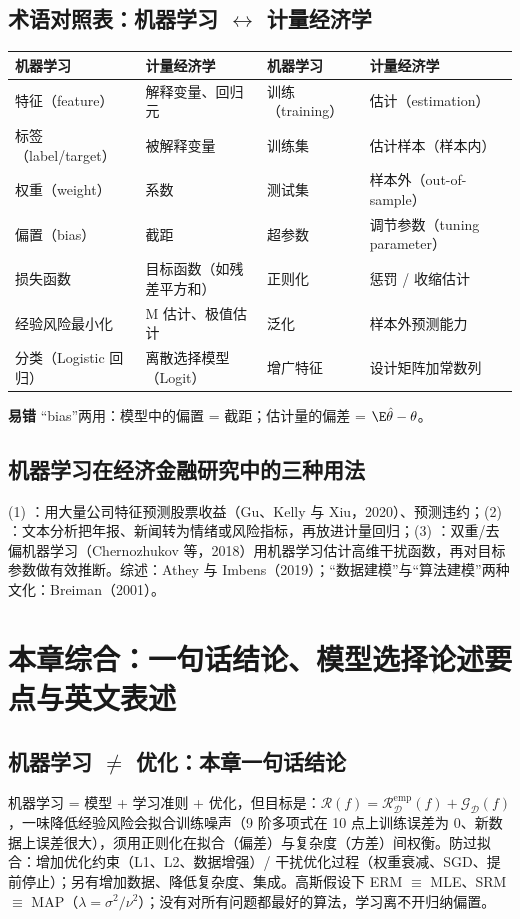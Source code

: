 \subsection{术语对照表：机器学习 \texorpdfstring{$\leftrightarrow$}{<->} 计量经济学}
\begin{center}\small\renewcommand{\arraystretch}{1.1}
\begin{tabularx}{\linewidth}{@{}p{3.3cm}Lp{2.6cm}L@{}}
\toprule
机器学习 & 计量经济学 & 机器学习 & 计量经济学 \\
\midrule
特征（feature） & 解释变量、回归元 & 训练（training） & 估计（estimation） \\
标签（label/target） & 被解释变量 & 训练集 & 估计样本（样本内） \\
权重（weight） & 系数 & 测试集 & 样本外（out-of-sample） \\
偏置（bias） & 截距 & 超参数 & 调节参数（tuning parameter） \\
损失函数 & 目标函数（如残差平方和） & 正则化 & 惩罚 / 收缩估计 \\
经验风险最小化 & M 估计、极值估计 & 泛化 & 样本外预测能力 \\
分类（Logistic 回归） & 离散选择模型（Logit） & 增广特征 & 设计矩阵加常数列 \\
\bottomrule
\end{tabularx}
\end{center}
\textbf{易错} “bias”两用：模型中的偏置 = 截距；估计量的偏差 = $\E\hat\theta-\theta$。

\subsection{机器学习在经济金融研究中的三种用法}
(1) ：用大量公司特征预测股票收益（Gu、Kelly 与 Xiu，2020）、预测违约；(2) ：文本分析把年报、新闻转为情绪或风险指标，再放进计量回归；(3) ：双重/去偏机器学习（Chernozhukov 等，2018）用机器学习估计高维干扰函数，再对目标参数做有效推断。综述：Athey 与 Imbens（2019）；“数据建模”与“算法建模”两种文化：Breiman（2001）。

\section{本章综合：一句话结论、模型选择论述要点与英文表述}

\subsection{机器学习 \texorpdfstring{$\ne$}{!=} 优化：本章一句话结论}
机器学习 = 模型 + 学习准则 + 优化，但目标是：$\mathcal R(f)=\mathcal R^{\mathrm{emp}}_{\mathcal D}(f)+\mathcal G_{\mathcal D}(f)$，一味降低经验风险会拟合训练噪声（9 阶多项式在 10 点上训练误差为 0、新数据上误差很大），须用正则化在拟合（偏差）与复杂度（方差）间权衡。防过拟合：增加优化约束（L1、L2、数据增强）/ 干扰优化过程（权重衰减、SGD、提前停止）；另有增加数据、降低复杂度、集成。高斯假设下 ERM $\equiv$ MLE、SRM $\equiv$ MAP（$\lambda=\sigma^2/\nu^2$）；没有对所有问题都最好的算法，学习离不开归纳偏置。

